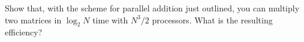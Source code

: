   Show that, with the scheme for parallel addition just outlined, you
  can multiply two matrices in $\log_2 N$ time with $N^3/2$
  processors. What is the resulting efficiency?
